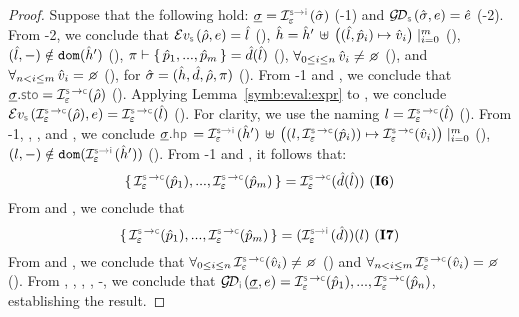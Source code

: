 \begin{proof}
Suppose that the following hold: 
$\istate = \interpret{\symbinst}{\senv}(\sstate)$ (\hyp{1}) and $\absgetdomainfun{\symbolic}(\sstate, \jsilexpr) = \sexpr$ (\hyp{2}). 
From \hyp{2}, we conclude that 
$\evalexpr{\symbolic}(\sstore, \jsilexpr) = \sloc$ (), 
$\hat{h} = \hat{h}' \, \uplus \, \big((\hat{l}, \hat{p}_i) \mapsto \hat{v}_i \big)\mid_{i = 0}^m$ (), 
$(\hat{l},-) \notin \texttt{dom} (\hat{h}')$ (), 
$\pi \vdash \{ \, \hat{p}_1, ..., \hat{p}_m \, \} = \hat{d}(\hat{l})$ (), 
$\forall_{0 \leq i \leq n} \, \sexprv_i \neq \none$ (), 
and $\forall_{n < i \leq m} \, \sexprv_i = \none$ (), for $\hat{\sigma} = (\hat{h}, \hat{d}, \hat\rho, \pi)$ (). 
From \hyp{1} and , we conclude that $\istate.\stosel = \interpret{\symbconc}{\senv}(\sstore)$ (). 
 Applying Lemma~\ref{symb:eval:expr} to , we conclude 
 $\evalexpr{\symbolic}(\interpret{\symbconc}{\senv}(\sstore), \jsilexpr) = \interpret{\symbconc}{\senv}(\sloc)$ (). 
 For clarity, we use the naming $\loc = \interpret{\symbconc}{\senv}(\sloc)$ (). 
 From \hyp{1}, , , and , we conclude 
 $\istate.\hpsel =  \interpret{\symbinst}{\senv}(\sheap') \, \uplus \, \big((\loc, \interpret{\symbconc}{\senv}(\sexprp_i)) \mapsto \interpret{\symbconc}{\senv}(\sexprv_i) \big)\mid_{i = 0}^m$ (), 
$(\loc,-) \notin \domain (\interpret{\symbinst}{\senv}(\sheap'))$ ().
From \hyp{1} and , it follows that: 
$$\jsilset{\interpret{\symbconc}{\senv}(\sexprp_1), ..., \interpret{\symbconc}{\senv}(\sexprp_m)} = \interpret{\symbconc}{\senv}(\sdom(\sloc)) \text{ (\ieq{6})}$$
From  and , we conclude that 
 $$\jsilset{\interpret{\symbconc}{\senv}(\sexprp_1), ..., \interpret{\symbconc}{\senv}(\sexprp_m)} = (\interpret{\symbinst}{\senv}(\sdom))(\loc) \text{ (\ieq{7})}$$ 
 From  and , we conclude that 
 {\small $\forall_{0 \leq i \leq n} \, \interpret{\symbconc}{\senv}(\sexprv_i) \neq \none$} () and  
{\small $\forall_{n < i \leq m} \, \interpret{\symbconc}{\senv}(\sexprv_i) = \none$} ().
From , , , , -, we conclude that 
$\absgetdomainfun{\instrumented}(\istate, \jsilexpr) = \interpret{\symbconc}{\senv}(\sexprp_1), ..., \interpret{\symbconc}{\senv}(\sexprp_n)$, 
establishing the result. 
\end{proof}


